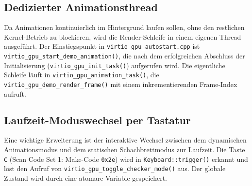 \subsection{Dedizierter Animationsthread}
Da Animationen kontinuierlich im Hintergrund laufen sollen, ohne den restlichen
Kernel-Betrieb zu blockieren, wird die Render-Schleife in einem eigenen Thread
ausgeführt. Der Einstiegspunkt in \texttt{virtio\_gpu\_autostart.cpp} ist
\texttt{virtio\_gpu\_start\_demo\_animation()}, die nach dem erfolgreichen
Abschluss der Initialisierung (\texttt{virtio\_gpu\_init\_task()}) aufgerufen
wird. Die eigentliche Schleife läuft in
\texttt{virtio\_gpu\_animation\_task()}, die
\texttt{virtio\_gpu\_demo\_render\_frame()} mit einem inkrementierenden
Frame-Index aufruft.

\begin{center}
\end{center}

\subsection{Laufzeit-Moduswechsel per Tastatur}
Eine wichtige Erweiterung ist der interaktive Wechsel zwischen dem dynamischen
Animationsmodus und dem statischen Schachbrettmodus zur Laufzeit. Die Taste
\texttt{C} (Scan Code Set 1: Make-Code \texttt{0x2e}) wird in
\texttt{Keyboard::trigger()} erkannt und löst den Aufruf von
\texttt{virtio\_gpu\_toggle\_checker\_mode()} aus. Der globale Zustand wird
durch eine atomare Variable gespeichert.

